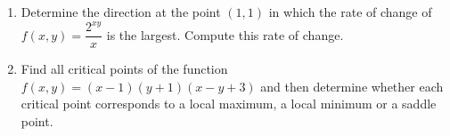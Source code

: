 \documentclass[a4paper, 12pt]{article}
\renewcommand{\headrulewidth}{0pt}
\begin{document}
\begin{enumerate}[leftmargin=*,label=\textbf{\arabic*.}]
Show that in the polar coordinate system $(x=r\cos\theta,\:y=r\sin\theta)$,
\[\frac{\partial u}{\partial r}=\frac1r\frac{\partial v}{\partial\theta}\quad\text{and}\quad\frac{\partial v}{\partial r}=-\frac1r\frac{\partial u}{\partial \theta}\]

\item Determine the direction at the point $(1,1)$ in which the rate of change of $f(x,y)=\dfrac{2^{xy}}x$ is the largest. Compute this rate of change.

\item Find all critical points of the function $f(x,y)=(x-1)(y+1)(x-y+3)$ and then determine whether each critical point corresponds to a local maximum, a local minimum or a saddle point.
\end{enumerate}

\newpage
\pagestyle{fancy}
\renewcommand{\headrulewidth}{1pt}

\end{document}
